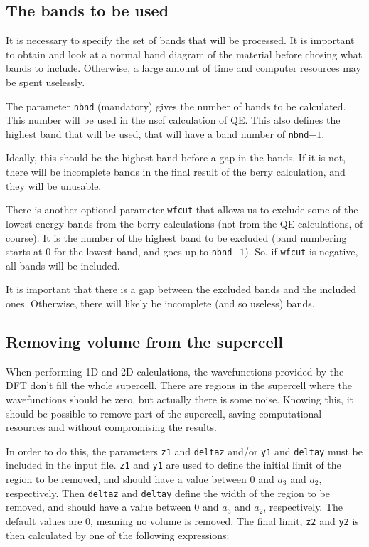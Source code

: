 \documentclass[a4paper,12pt]{report}
\begin{document}
\bigskip

 \subsection{The bands to be used}

 It is necessary to specify the set of bands that will be processed.
 It is important to obtain and look at a normal band diagram of the material before chosing
 what bands to include.
 Otherwise, a large amount of time and computer resources may be spent uselessly.

 The parameter \verb|nbnd| (mandatory) gives the number of bands to be calculated.
 This number will be used in the nscf calculation of QE.
 This also defines the highest band that will be used, that will have a band number of \verb|nbnd|$-1$.

 Ideally, this should be the highest band before a gap in the bands.
 If it is not, there will be incomplete bands in the final result of the berry calculation,
 and they will be unusable.

 There is another optional parameter \verb|wfcut| that allows us to exclude some of the lowest energy bands
 from the berry calculations (not from the QE calculations, of course).
 It is the number of the highest band to be excluded
 (band numbering starts at 0 for the lowest band, and goes up to \verb|nbnd|$-1$).
 So, if \verb|wfcut| is negative, all bands will be included.

 It is important that there is a gap between the excluded bands and the included ones.
 Otherwise, there will likely be incomplete (and so useless) bands.


\bigskip

 \subsection{Removing volume from the supercell}

 When performing 1D and 2D calculations, the wavefunctions provided by the DFT don't fill the whole
 supercell.
 There are regions in the supercell where the wavefunctions should be zero, but actually
 there is some noise.
 Knowing this, it should be possible to remove part of the supercell, saving computational
 resources and without compromising the results.

 In order to do this, the parameters \verb|z1| and \verb|deltaz| and/or \verb|y1| and \verb|deltay| 
  must be included in the input file.
 \verb|z1| and \verb|y1| are used to define the initial limit of the region to be removed, and 
 should have a value between 0 and $a_3$ and $a_2$, respectively.
 Then \verb|deltaz| and \verb|deltay| define the width of the region to be removed, and should have 
 a value between 0 and $a_3$ and $a_2$, respectively.
 The default values are 0, meaning no volume is removed.
 The final limit, \verb|z2| and \verb|y2| is then calculated by one of the following expressions:
 
\end{document}
